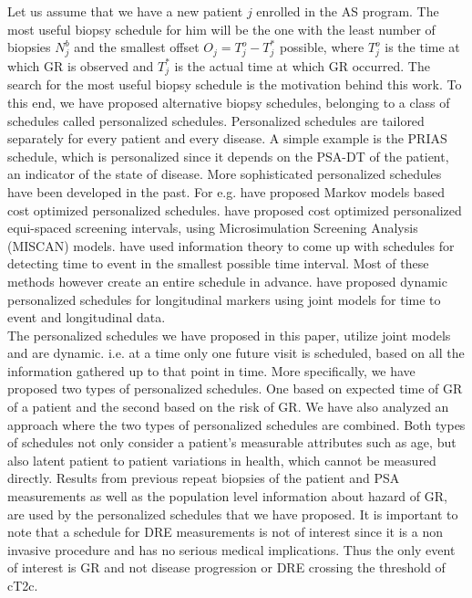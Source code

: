 Let us assume that we have a new patient $j$ enrolled in the AS program. The most useful biopsy schedule for him will be the one with the least number of biopsies $N_j^b$ and the smallest offset $O_j = T_j^o - T_j^*$ possible, where $T_j^o$ is the time at which GR is observed and $T_j^*$ is the actual time at which GR occurred. The search for the most useful biopsy schedule is the motivation behind this work. To this end, we have proposed alternative biopsy schedules, belonging to a class of schedules called personalized schedules. Personalized schedules are tailored separately for every patient and every disease. A simple example is the PRIAS schedule, which is personalized since it depends on the PSA-DT of the patient, an indicator of the state of disease. More sophisticated personalized schedules have been developed in the past. For e.g. \cite{bebu2017OptimalScreening} have proposed Markov models based cost optimized personalized schedules. \cite{oMahonyOptimaInterval} have proposed cost optimized personalized equi-spaced screening intervals, using Microsimulation Screening Analysis (MISCAN) models. \cite{parmigiani1998designing} have used information theory to come up with schedules for detecting time to event in the smallest possible time interval. Most of these methods however create an entire schedule in advance. \cite{drizopoulosPersScreening} have proposed dynamic personalized schedules for longitudinal markers using joint models for time to event and longitudinal data\citep{tsiatis2004joint,rizopoulos2012joint}.\\

The personalized schedules we have proposed in this paper, utilize joint models and are dynamic. i.e. at a time only one future visit is scheduled, based on all the information gathered up to that point in time. More specifically, we have proposed two types of personalized schedules. One based on expected time of GR of a patient and the second based on the risk of GR. We have also analyzed an approach where the two types of personalized schedules are combined. Both types of schedules not only consider a patient's measurable attributes such as age, but also latent patient to patient variations in health, which cannot be measured directly. Results from previous repeat biopsies of the patient and PSA measurements as well as the population level information about hazard of GR, are used by the personalized schedules that we have proposed. It is important to note that a schedule for DRE measurements is not of interest since it is a non invasive procedure and has no serious medical implications. Thus the only event of interest is GR and not disease progression or DRE crossing the threshold of cT2c.\\

